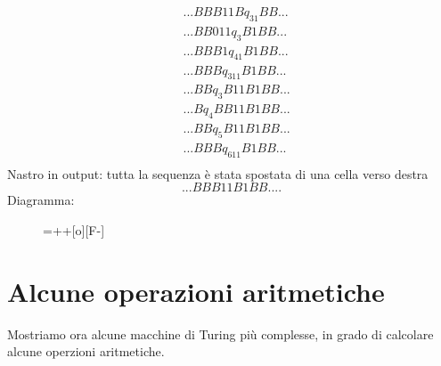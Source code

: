 \begin{itemize}
\begin{eqnarray*}
&...BBB11Bq_31BB...\\
&...BB011q_3B1BB...\\
&...BBB1q_41B1BB...\\
&...BBBq_311B1BB...\\
&...BBq_3B11B1BB...\\
&...Bq_4BB11B1BB...\\
&...BBq_5B11B1BB...\\
&...BBBq_611B1BB...\\
\end{eqnarray*}
Nastro in output: tutta la sequenza \`e stata spostata di una cella
verso destra $$...BBB11B1BB....$$ Diagramma:
\begin{figure}[hbtp!]
\hspace{3 cm} \entrymodifiers={++[o][F-]} \\
\end{figure}

\end{itemize}

\section{Alcune operazioni aritmetiche}
Mostriamo ora alcune macchine di Turing pi\`u complesse, in grado di
calcolare alcune operzioni aritmetiche.\\

